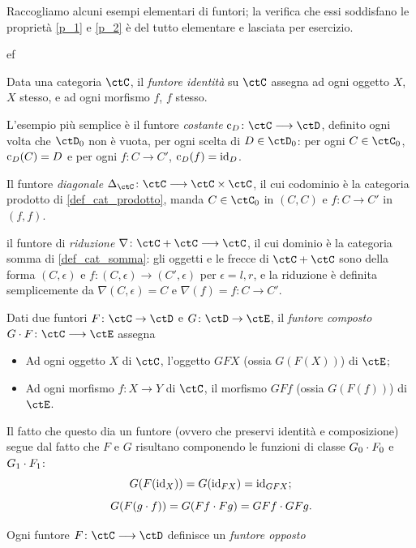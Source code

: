 \begin{examples}\label{es_di_funtori}
 Raccogliamo alcuni esempi elementari di funtori; la verifica che essi soddisfano le proprietà \ref{p_1} e \ref{p_2} è del tutto elementare e lasciata per esercizio.
 \begin{enumtag}{ef}
  \item \label{exfun_1} Data una categoria \(\ctC\), il \emph{funtore identità} su \(\ctC\) assegna ad ogni oggetto \(X\), \(X\) stesso, e ad ogni morfismo \(f\), \(f\) stesso.
  \item \label{exfun_2} L'esempio più semplice è il funtore \emph{costante} \(\const_D \colon \ctC\fun\ctD\), definito ogni volta che \(\ctD_0\) non è vuota, per ogni scelta di \(D\in\ctD_0\): per ogni \(C\in\ctC_0\), \(\text{c}_D(C)=D\) e per ogni \(f \colon C\to C'\), \(\text{c}_D(f)=\mathrm{id}_D\).
  \item \label{exfun_3} Il funtore \emph{diagonale} \(\Delta_\ctC \colon \ctC \fun\ctC\times\ctC\), il cui codominio è la categoria prodotto di \ref{def_cat_prodotto}, manda \(C\in\ctC_0\) in \((C,C)\) e \(f \colon C\to C'\) in \((f,f)\).
  \item {}\label{exfun_4} il funtore di \emph{riduzione} \(\nabla \colon \ctC+\ctC \fun\ctC\), il cui dominio è la categoria somma di \ref{def_cat_somma}: gli oggetti e le frecce di \(\ctC+\ctC\) sono della forma \((C,\epsilon)\) e \(f \colon (C,\epsilon) \to (C',\epsilon)\) per \(\epsilon=l,r\), e la riduzione è definita semplicemente da \(\nabla(C,\epsilon)=C\) e \(\nabla(f)=f \colon C\to C'\).
  \item \label{exfun_5} Dati due funtori \(F\colon\ctC\to\ctD\) e \(G\colon\ctD\to\ctE\), il \emph{funtore composto} \(G\cmp F\colon\ctC\fun\ctE\) assegna
  \begin{itemize}
   \item Ad ogni oggetto \(X\) di \(\ctC\), l'oggetto \(GFX\) (ossia \(G(F(X))\)) di \(\ctE\);
   \item Ad ogni morfismo \(f\colon X\to Y\) di \(\ctC\), il morfismo \(GFf\) (ossia \(G(F(f))\)) di \(\ctE\).
  \end{itemize}
  Il fatto che questo dia un funtore (ovvero che preservi identità e composizione) segue dal fatto che \(F\) e \(G\) risultano componendo le funzioni di classe \(G_0\cdot F_0\) e \(G_1\cdot F_1\):
  \[
   G(F(\mathrm{id}_X)) = G(\mathrm{id}_{FX}) = \mathrm{id}_{GFX} ;
  \]
  \[
   G(F(g\cdot f)) = G(Ff\cdot Fg) = GFf\cdot GFg .
  \]
  \item \label{exfun_6} Ogni funtore \(F \colon \ctC\fun\ctD\) definisce un \emph{funtore opposto}

\end{enumtag}
\end{examples}
